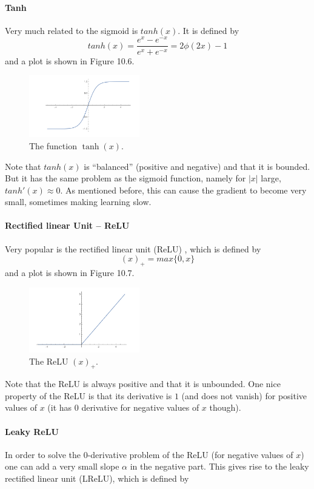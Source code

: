 \documentclass[twoside]{article}
\begin{document}
\paragraph{Tanh}
Very much related to the sigmoid is $tanh(x)$. It is defined by
$$tanh(x) = \dfrac{e^x - e^{-x}}{e^x + e^{-x}} = 2\phi(2x) -1$$
and a plot is shown in Figure 10.6. 

\begin{figure}[h]
\centering
\includegraphics[width=0.43\textwidth]{img/tanh.png}
\caption{The function $\tanh(x)$.}
\end{figure}

Note that $tanh(x)$ is “balanced” (positive and negative) and that it is bounded. But
it has the same problem as the sigmoid function, namely for
$|x|$ large, $tanh'(x) \approx 0$. As mentioned before, this can cause the
gradient to become very small, sometimes making learning slow.

\paragraph{Rectified linear Unit – ReLU}
Very popular is the rectified linear unit (ReLU) , which is defined by
$$(x)_{+} = max\{0,x\}$$
and a plot is shown in Figure 10.7.

\begin{figure}[h]
\centering
\includegraphics[width=0.43\textwidth]{img/relu.png}
\caption{The ReLU $(x)_{+}$.}
\end{figure}

Note that the ReLU is always positive and that it is unbounded. One nice property
of the ReLU is that its derivative is $1$ (and does not vanish)
for positive values of $x$ (it has $0$ derivative for negative values
of $x$ though).

\paragraph{Leaky ReLU}
In order to solve the $0$-derivative problem of the ReLU (for
negative values of $x$) one can add a very small slope $\alpha$ in
the negative part. This gives rise to the leaky rectified linear
unit (LReLU), which is defined by
\end{document}
